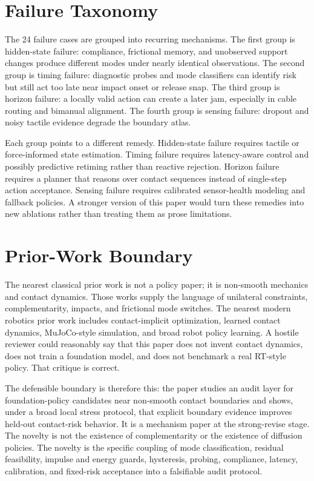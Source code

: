 \documentclass{article}
\begin{document}
\clearpage
\section{Failure Taxonomy}
The 24 failure cases are grouped into recurring mechanisms. The first group is hidden-state failure: compliance, frictional memory, and unobserved support changes produce different modes under nearly identical observations. The second group is timing failure: diagnostic probes and mode classifiers can identify risk but still act too late near impact onset or release snap. The third group is horizon failure: a locally valid action can create a later jam, especially in cable routing and bimanual alignment. The fourth group is sensing failure: dropout and noisy tactile evidence degrade the boundary atlas.

Each group points to a different remedy. Hidden-state failure requires tactile or force-informed state estimation. Timing failure requires latency-aware control and possibly predictive retiming rather than reactive rejection. Horizon failure requires a planner that reasons over contact sequences instead of single-step action acceptance. Sensing failure requires calibrated sensor-health modeling and fallback policies. A stronger version of this paper would turn these remedies into new ablations rather than treating them as prose limitations.

\clearpage
\section{Prior-Work Boundary}
The nearest classical prior work is not a policy paper; it is non-smooth mechanics and contact dynamics. Those works supply the language of unilateral constraints, complementarity, impacts, and frictional mode switches. The nearest modern robotics prior work includes contact-implicit optimization, learned contact dynamics, MuJoCo-style simulation, and broad robot policy learning. A hostile reviewer could reasonably say that this paper does not invent contact dynamics, does not train a foundation model, and does not benchmark a real RT-style policy. That critique is correct.

The defensible boundary is therefore this: the paper studies an audit layer for foundation-policy candidates near non-smooth contact boundaries and shows, under a broad local stress protocol, that explicit boundary evidence improves held-out contact-risk behavior. It is a mechanism paper at the strong-revise stage. The novelty is not the existence of complementarity or the existence of diffusion policies. The novelty is the specific coupling of mode classification, residual feasibility, impulse and energy guards, hysteresis, probing, compliance, latency, calibration, and fixed-risk acceptance into a falsifiable audit protocol.
\end{document}
